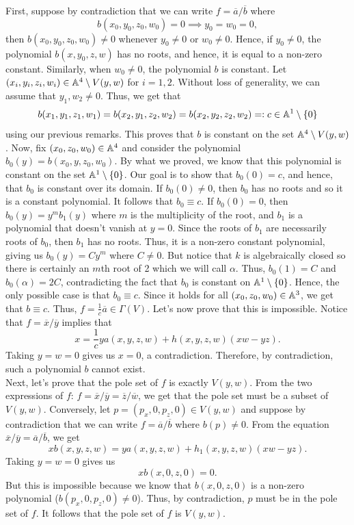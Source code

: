 \begin{solution}
    First, suppose by contradiction that we can write $f = \overline{a}/\overline{b}$ where
    $$b(x_0,y_0,z_0,w_0) = 0 \implies y_0 = w_0 = 0,$$
    then $b(x_0,y_0,z_0,w_0) \neq 0$ whenever $y_0 \neq 0$ or $w_0 \neq 0$. Hence, if $y_0 \neq 0$, the polynomial $b(x,y_0, z, w)$ has no roots, and hence, it is equal to a non-zero constant. Similarly, when $w_0 \neq 0$, the polynomial $b$ is constant. Let $(x_i,y_i,z_i,w_i) \in \mathbb{A}^4\setminus V(y,w)$ for $i=1,2$. Without loss of generality, we can assume that $y_1, w_2 \neq 0$. Thus, we get that
    $$b(x_1, y_1, z_1, w_1) = b(x_2, y_1, z_2, w_2) = b(x_2, y_2, z_2, w_2) =: c \in \mathbb{A}^1\setminus \{0\}$$
    using our previous remarks. This proves that $b$ is constant on the set $\mathbb{A}^4\setminus V(y,w)$. Now, fix $(x_0,z_0, w_0) \in \mathbb{A}^4$ and consider the polynomial $b_0(y) = b(x_0, y, z_0, w_0)$. By what we proved, we know that this polynomial is constant on the set $\mathbb{A}^1\setminus\{0\}$. Our goal is to show that $b_0(0) = c$, and hence, that $b_0$ is constant over its domain. If $b_0(0) \neq 0$, then $b_0$ has no roots and so it is a constant polynomial. It follows that $b_0 \equiv c$. If $b_0(0) = 0$, then $b_0(y) = y^m b_1(y)$ where $m$ is the multiplicity of the root, and $b_1$ is a polynomial that doesn't vanish at $y = 0$. Since the roots of $b_1$ are necessarily roots of $b_0$, then $b_1$ has no roots. Thus, it is a non-zero constant polynomial, giving us $b_0(y) = Cy^m$ where $C\neq 0$. But notice that $k$ is algebraically closed so there is certainly an $m$th root of 2 which we will call $\alpha$. Thus, $b_0(1) = C$ and $b_0(\alpha) = 2C$, contradicting the fact that $b_0$ is constant on $\mathbb{A}^1\setminus \{0\}$. Hence, the only possible case is that $b_0 \equiv c$. Since it holds for all $(x_0, z_0, w_0) \in \mathbb{A}^3$, we get that $b \equiv c$. Thus, $f = \frac{1}{c}\overline{a} \in \Gamma(V)$. Let's now prove that this is impossible. Notice that $f = \overline{x}/\overline{y}$ implies that
    $$x = \frac{1}{c}ya(x,y,z,w) + h(x,y,z,w)(xw - yz).$$
    Taking $y = w = 0$ gives us $x = 0$, a contradiction. Therefore, by contradiction, such a polynomial $b$ cannot exist.\\

    Next, let's prove that the pole set of $f$ is exactly $V(y,w)$. From the two expressions of $f$: $f = \overline{x}/\overline{y} = \overline{z}/\overline{w}$, we get that the pole set must be a subset of $V(y,w)$. Conversely, let $p = (p_x, 0, p_z, 0) \in V(y,w)$ and suppose by contradiction that we can write $f = \overline{a}/\overline{b}$ where $b(p) \neq 0$. From the equation $\overline{x}/\overline{y} = \overline{a}/\overline{b}$, we get
    $$xb(x,y,z,w) = ya(x,y,z,w) + h_1(x,y,z,w)(xw - yz).$$
    Taking $y = w = 0$ gives us
    $$xb(x,0,z,0) = 0.$$
    But this is impossible because we know that $b(x,0,z,0)$ is a non-zero polynomial ($b(p_x, 0, p_z, 0) \neq 0$). Thus, by contradiction, $p$ must be in the pole set of $f$. It follows that the pole set of $f$ is $V(y,w)$. \\
\end{solution}

